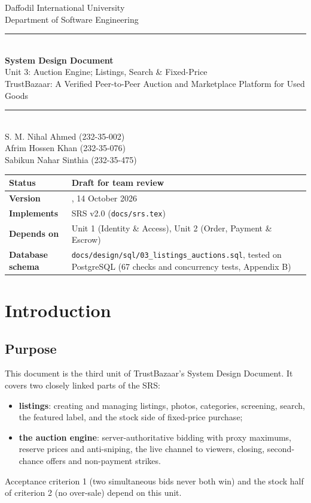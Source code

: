 \documentclass[11pt,a4paper]{article}
\begin{document}
\begin{titlepage}
\centering
\vspace*{1cm}
{\Large Daffodil International University}\\[0.2cm]
{\large Department of Software Engineering}\\[2cm]
\rule{\linewidth}{0.5pt}\\[0.4cm]
{\huge\bfseries System Design Document}\\[0.3cm]
{\LARGE Unit 3: Auction Engine; Listings, Search \& Fixed-Price}\\[0.3cm]
{\large TrustBazaar: A Verified Peer-to-Peer Auction and Marketplace Platform for Used Goods}\\[0.2cm]
\rule{\linewidth}{0.5pt}\\[1.6cm]
{\large S. M. Nihal Ahmed (232-35-002)\\[0.1cm] Afrim Hossen Khan (232-35-076)\\[0.1cm] Sabikun Nahar Sinthia (232-35-475)}\\[1.6cm]
\begin{tabular}{|l|>{\raggedright\arraybackslash}p{8cm}|}
\hline
\textbf{Status} & Draft for team review \\ \hline
\textbf{Version} & 0.1, 14 October 2026 \\ \hline
\textbf{Implements} & SRS v2.0 (\texttt{docs/srs.tex}) \\ \hline
\textbf{Depends on} & Unit 1 (Identity \& Access), Unit 2 (Order, Payment \& Escrow) \\ \hline
\textbf{Database schema} & \texttt{docs/design/sql/03\_listings\_auctions.sql}, tested on PostgreSQL (67 checks and concurrency tests, Appendix B) \\ \hline
\end{tabular}
\vfill
\end{titlepage}
\tableofcontents
\newpage
\section{Introduction}

\subsection{Purpose}
This document is the third unit of TrustBazaar's System Design Document. It covers two closely linked parts of the SRS:
\begin{itemize}[nosep]
  \item \textbf{listings}: creating and managing listings, photos, categories, screening, search, the featured label, and the stock side of fixed-price purchase;
  \item \textbf{the auction engine}: server-authoritative bidding with proxy maximums, reserve prices and anti-sniping, the live channel to viewers, closing, second-chance offers and non-payment strikes.
\end{itemize}
Acceptance criterion 1 (two simultaneous bids never both win) and the stock half of criterion 2 (no over-sale) depend on this unit.
\end{document}
